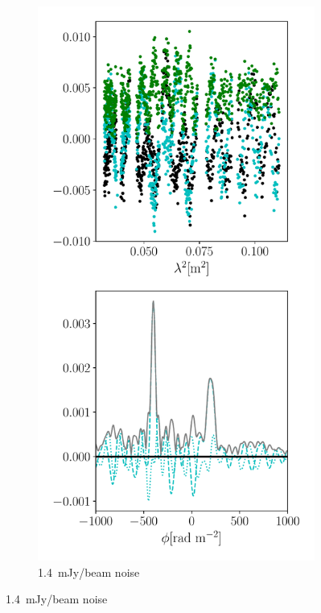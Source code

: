 \documentclass[xetex,aspectratio=169]{beamer}
\begin{document}
\begin{frame}
\begin{figure}
\begin{subfigure}{0.2\textwidth}
		\end{subfigure}
		\begin{subfigure}{0.2\textwidth}
			\includegraphics[width=\textwidth]{figures/dataset_features/data_noisy.pdf}
			\caption{1.4~mJy/beam noise}
		\end{subfigure}
	\end{figure}

\end{frame}
\end{document}
